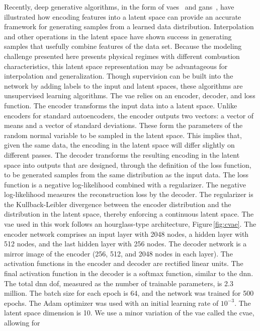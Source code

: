 \documentclass[review]{elsarticle}
\begin{document}
Recently, deep generative algorithms, in the form of
\glspl{vae}~\cite{Kingma2013, Rezende2014} and
\glspl{gan}~\cite{Goodfellow2014}, have illustrated how encoding
features into a latent space can provide an accurate framework for
generating samples from a learned data distribution. Interpolation and
other operations in the latent space have shown success in generating
samples that usefully combine features of the data set. Because the
modeling challenge presented here presents physical regimes with
different combustion characteristics, this latent space representation
may be advantageous for interpolation and generalization. Though
supervision can be built into the network by adding labels to the
input and latent spaces, these algorithms are unsupervised learning
algorithms. The \gls{vae} relies on an encoder, decoder, and loss
function. The encoder transforms the input data into a latent
space. Unlike encoders for standard autoencoders, the encoder outputs
two vectors: a vector of means and a vector of standard
deviations. These form the parameters of the random normal variable to
be sampled in the latent space. This implies that, given the same
data, the encoding in the latent space will differ slightly on
different passes. The decoder transforms the resulting encoding in the
latent space into outputs that are designed, through the definition of
the loss function, to be generated samples from the same distribution
as the input data. The loss function is a negative log-likelihood
combined with a regularizer. The negative log-likelihood measures the
reconstruction loss by the decoder. The regularizer is the
Kullback-Leibler divergence between the encoder distribution and the
distribution in the latent space, thereby enforcing a continuous
latent space. The \gls{vae} used in this work follows an
hourglass-type architecture, Figure\,\ref{fig:cvae}. The encoder
network comprises an input layer with 2048 nodes, a hidden layer with
512 nodes, and the last hidden layer with 256 nodes. The decoder
network is a mirror image of the encoder (256, 512, and 2048 nodes in
each layer). The activation functions in the encoder and decoder are
rectified linear units. The final activation function in the decoder
is a softmax function, similar to the \gls{dnn}. The total \gls{dnn}
\gls{dof}, measured as the number of trainable parameters, is 2.3
million. The batch size for each epoch is 64, and the network was
trained for 500 epochs. The Adam optimizer was used with an initial
learning rate of $10^{-3}$. The latent space dimension is 10. We use a
minor variation of the \gls{vae} called the \gls{cvae}, allowing for
\end{document}
